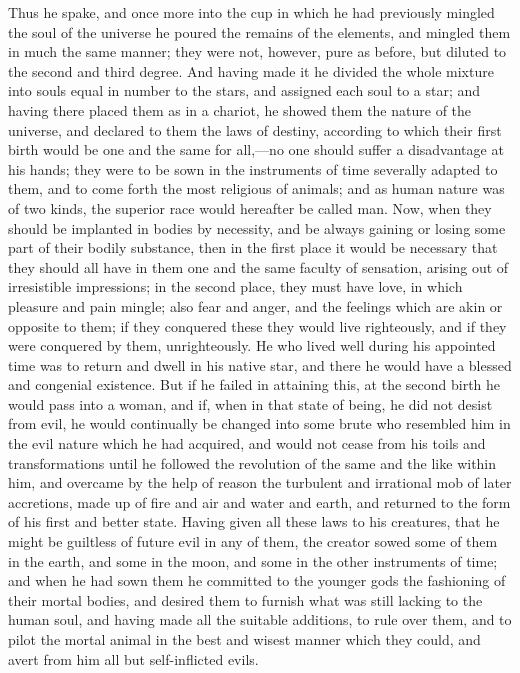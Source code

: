 Thus he spake, and once more into the cup in which he had previously
mingled the soul of the universe he poured the remains of the elements,
and mingled them in much the same manner; they were not, however, pure as
before, but diluted to the second and third degree. And having made it he
divided the whole mixture into souls equal in number to the stars, and
assigned each soul to a star; and having there placed them as in a
chariot, he showed them the nature of the universe, and declared to them
the laws of destiny, according to which their first birth would be one and
the same for all,—no one should suffer a disadvantage at his hands;
they were to be sown in the instruments of time severally adapted to them,
and to come forth the most religious of animals; and as human nature was
of two kinds, the superior race would hereafter be called man. Now, when
they should be implanted in bodies by necessity, and be always gaining or
losing some part of their bodily substance, then in the first place it
would be necessary that they should all have in them one and the same
faculty of sensation, arising out of irresistible impressions; in the
second place, they must have love, in which pleasure and pain mingle; also
fear and anger, and the feelings which are akin or opposite to them; if
they conquered these they would live righteously, and if they were
conquered by them, unrighteously. He who lived well during his appointed
time was to return and dwell in his native star, and there he would have a
blessed and congenial existence. But if he failed in attaining this, at
the second birth he would pass into a woman, and if, when in that state of
being, he did not desist from evil, he would continually be changed into
some brute who resembled him in the evil nature which he had acquired, and
would not cease from his toils and transformations until he followed the
revolution of the same and the like within him, and overcame by the help
of reason the turbulent and irrational mob of later accretions, made up of
fire and air and water and earth, and returned to the form of his first
and better state. Having given all these laws to his creatures, that he
might be guiltless of future evil in any of them, the creator sowed some
of them in the earth, and some in the moon, and some in the other
instruments of time; and when he had sown them he committed to the younger
gods the fashioning of their mortal bodies, and desired them to furnish
what was still lacking to the human soul, and having made all the suitable
additions, to rule over them, and to pilot the mortal animal in the best
and wisest manner which they could, and avert from him all but
self-inflicted evils.

